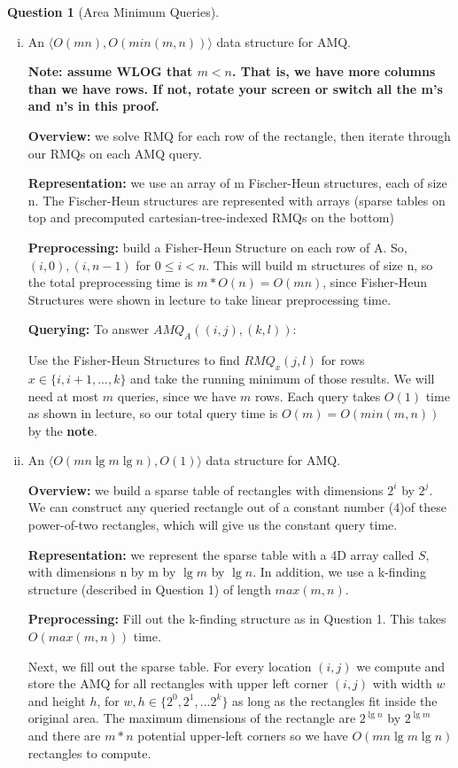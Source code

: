 \documentclass{article}
\newtheorem{ques}{Question}
\newcommand{\pq}[2]{\langle O(#1), O(#2) \rangle}
\renewcommand{\b}[1]{\textbf{#1}}
\begin{document}
\begin{ques}[Area Minimum Queries]
\end{ques}
\begin{enumerate}[i.]
  \item An $\pq{mn}{min(m,n)}$ data structure for AMQ.

  \b{Note: assume WLOG that $m < n$. That is, we have more columns than we have rows. If not, rotate your screen or switch all the m's and n's in this proof.}

  \b{Overview:} we solve RMQ for each row of the rectangle, then iterate through our RMQs on each AMQ query.

  \b{Representation:} we use an array of m Fischer-Heun structures, each of size n. The Fischer-Heun structures are represented with arrays (sparse tables on top and precomputed cartesian-tree-indexed RMQs on the bottom)

  \b{Preprocessing:} build a Fisher-Heun Structure on each row of A. So, $(i, 0), (i, n-1)$ for $0 \le i < n$. This will build m structures of size n, so the total preprocessing time is $m * O(n) = O(mn)$, since Fisher-Heun Structures were shown in lecture to take linear preprocessing time.

  \b{Querying:} To answer $AMQ_A((i,j),(k,l))$:

  Use the Fisher-Heun Structures to find $RMQ_x (j,l)$ for rows $x \in \{i, i + 1, ..., k\}$ and take the running minimum of those results. We will need at most $m$ queries, since we have $m$ rows. Each query takes $O(1)$ time as shown in lecture, so our total query time is $O(m) = O(min(m,n))$ by the \b{note}.

  \item An $\pq{mn \lg m \lg n}{1}$ data structure for AMQ.
  
  \b{Overview:} we build a sparse table of rectangles with dimensions $2^i$ by $2^j$. We can construct any queried rectangle out of a constant number (4)of these power-of-two rectangles, which will give us the constant query time.

  \b{Representation:} we represent the sparse table with a 4D array called $S$, with dimensions n by m by $\lg m$ by $\lg n$. In addition, we use a k-finding structure (described in Question 1) of length $max(m,n)$.

  \b{Preprocessing:} Fill out the k-finding structure as in Question 1. This takes $O(max(m,n))$ time.

  Next, we fill out the sparse table. For every location $(i,j)$ we compute and store the AMQ for all rectangles with upper left corner $(i, j)$ with width $w$ and height $h$, for $w,h \in \{ 2^0, 2^1, ... 2^k \}$ as long as the rectangles fit inside the original area. The maximum dimensions of the rectangle are $2^{\lg n}$ by $2^{\lg m}$ and there are $m*n$ potential upper-left corners so we have $O(mn\lg m \lg n)$ rectangles to compute.


\end{enumerate}
\end{document}
